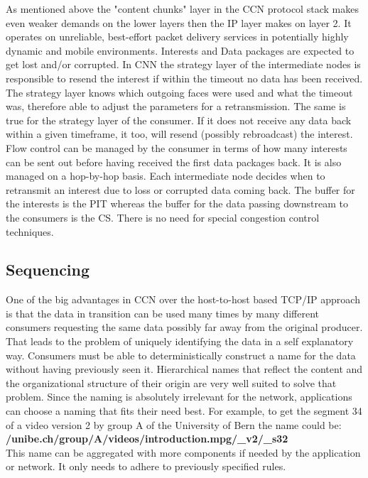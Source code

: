As mentioned above the "content chunks" layer in the CCN protocol stack makes even weaker demands on the lower layers then the IP layer makes on layer 2. It operates on unreliable, best-effort packet delivery services in potentially highly dynamic and mobile environments. Interests and Data packages are expected to get lost and/or corrupted. In CNN the strategy layer of the intermediate nodes is responsible to resend the interest if within the timeout no data has been received. The strategy layer knows which outgoing faces were used and what the timeout was, therefore able to adjust the parameters for a retransmission. The same is true for the strategy layer of the consumer. If it does not receive any data back within a given timeframe, it too, will resend (possibly rebroadcast) the interest.
\\
Flow control can be managed by the consumer in terms of how many interests can be sent out before having received the first data packages back. It is also managed on a hop-by-hop basis. Each intermediate node decides when to retransmit an interest due to loss or corrupted data coming back. The buffer for the interests is the PIT whereas the buffer for the data passing downstream to the consumers is the CS. There is no need for special congestion control techniques.

\subsection{Sequencing}

One of the big advantages in CCN over the host-to-host based TCP/IP approach is that the data in transition can be used many times by many different consumers requesting the same data possibly far away from the original producer. That leads to the problem of uniquely identifying the data in a self explanatory way. Consumers must be able to deterministically construct a name for the data without having previously seen it. Hierarchical names that reflect the content and the organizational structure of their origin are very well suited to solve that problem. Since the naming is absolutely irrelevant for the network, applications can choose a naming that fits their need best. For example, to get the segment 34 of a video version 2 by group A of the University of Bern the name could be: \textbf{/unibe.ch/group/A/videos/introduction.mpg/\_v2/\_s32}\\
This name can be aggregated with more components if needed by the application or network. It only needs to adhere to previously specified rules.


